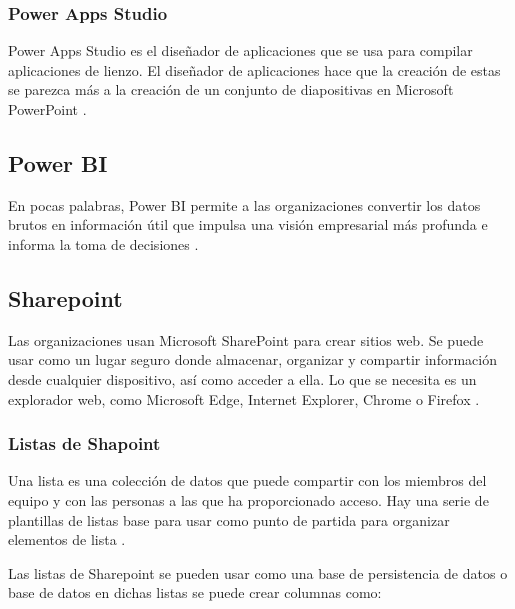 \subsubsection{Power Apps Studio}
Power Apps Studio es el diseñador de aplicaciones que se usa para compilar aplicaciones de lienzo. El diseñador de aplicaciones hace que la creación de estas se parezca más a la creación de un conjunto de diapositivas en Microsoft PowerPoint \citep{Microsoft}.

\subsection{Power BI}
En pocas palabras, Power BI permite a las organizaciones convertir los datos brutos en información útil que impulsa
una visión empresarial más profunda e informa la toma de decisiones \citet{Pearson2020}.
\subsection{Sharepoint}
Las organizaciones usan Microsoft SharePoint para crear sitios web. Se puede usar como un lugar seguro donde
almacenar, organizar y compartir información desde cualquier dispositivo, así como acceder a ella. Lo que se necesita es un
explorador web, como Microsoft Edge, Internet Explorer, Chrome o Firefox \citet{Microsoft}.

\subsubsection{Listas de Shapoint}
Una lista es una colección de datos que puede compartir con los miembros del equipo y con las personas a las que ha proporcionado acceso. Hay una serie de plantillas de listas base para usar como punto de partida para organizar elementos de lista \citep{Microsoft}.

Las listas de Sharepoint se pueden usar como una base de persistencia de datos o base de datos en dichas listas se puede crear columnas como:

